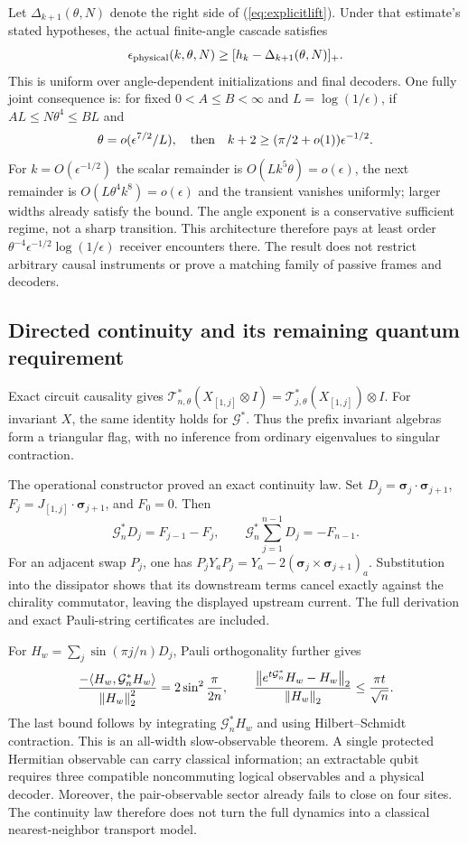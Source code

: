 Let $\Delta_{k+1}(\theta,N)$ denote the right side of
(\ref{eq:explicitlift}). Under that estimate's stated hypotheses, the actual
finite-angle cascade satisfies
\[
 \epsilon_{\rm physical}(k,\theta,N)
 \ge[h_k-\Delta_{k+1}(\theta,N)]_+.
\]
This is uniform over angle-dependent initializations and final decoders.
One fully joint consequence is: for fixed $0<A\le B<\infty$ and
$L=\log(1/\epsilon)$, if $AL\le N\theta^4\le BL$ and
\[
 \theta=o(\epsilon^{7/2}/L),
 \quad\hbox{then}\quad
 k+2\ge(\pi/2+o(1))\epsilon^{-1/2}.
\]
For $k=O(\epsilon^{-1/2})$ the scalar remainder is
$O(Lk^5\theta)=o(\epsilon)$, the next remainder is
$O(L\theta^4k^8)=o(\epsilon)$ and the transient vanishes uniformly;
larger widths already satisfy the bound. The angle exponent is a
conservative sufficient regime, not a sharp transition. This architecture
therefore pays at least order
$\theta^{-4}\epsilon^{-1/2}\log(1/\epsilon)$ receiver encounters there.
The result does not restrict arbitrary causal instruments or prove a
matching family of passive frames and decoders.

\subsection{Directed continuity and its remaining quantum requirement}
Exact circuit causality gives
$\mathcal T_{n,\theta}^*(X_{[1,j]}\otimes I)
=\mathcal T_{j,\theta}^*(X_{[1,j]})\otimes I$.
For invariant $X$, the same identity holds for $\mathcal G^*$.
Thus the prefix invariant algebras form a triangular flag, with no
inference from ordinary eigenvalues to singular contraction.

The operational constructor proved an exact continuity law. Set
$D_j=\boldsymbol\sigma_j\cdot\boldsymbol\sigma_{j+1}$,
$F_j=J_{[1,j]}\cdot\boldsymbol\sigma_{j+1}$, and $F_0=0$. Then
\[
 \mathcal G_n^*D_j=F_{j-1}-F_j,\qquad
 \mathcal G_n^*\sum_{j=1}^{n-1}D_j=-F_{n-1}.
\]
For an adjacent swap $P_j$, one has
$P_jY_aP_j=Y_a-2(\boldsymbol\sigma_j\times\boldsymbol\sigma_{j+1})_a$.
Substitution into the dissipator shows that its downstream terms cancel
exactly against the chirality commutator, leaving the displayed upstream
current. The full derivation and exact Pauli-string certificates are included.

For $H_w=\sum_j\sin(\pi j/n)D_j$, Pauli orthogonality further gives
\[
 \frac{-\langle H_w,\mathcal G_n^*H_w\rangle}{\left\lVert H_w\right\rVert_2^2}
 =2\sin^2\frac{\pi}{2n},\qquad
 \frac{\left\lVert e^{t\mathcal G_n^*}H_w-H_w\right\rVert_2}{\left\lVert H_w\right\rVert_2}
 \le\frac{\pi t}{\sqrt n}.
\]
The last bound follows by integrating $\mathcal G_n^*H_w$ and using
Hilbert--Schmidt contraction. This is an all-width slow-observable theorem.
A single protected Hermitian observable can carry classical information;
an extractable qubit requires three compatible noncommuting logical
observables and a physical decoder. Moreover, the pair-observable sector
already fails to close on four sites. The continuity law therefore does
not turn the full dynamics into a classical nearest-neighbor transport model.

